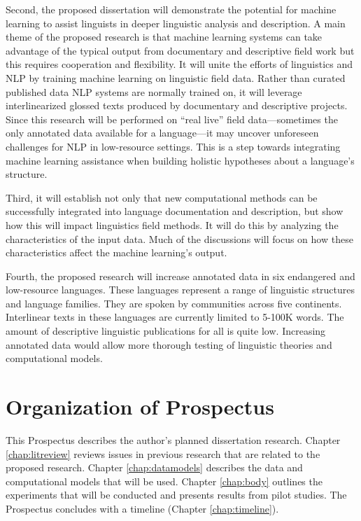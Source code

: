 Second, the proposed dissertation will demonstrate the potential for machine learning to assist linguists in deeper linguistic analysis and description. A main theme of the proposed research is that machine learning systems can take advantage of the typical output from documentary and descriptive field work but this requires cooperation and flexibility. It will unite the efforts of linguistics and NLP by training machine learning on linguistic field data. Rather than curated published data  NLP systems are normally trained on, it will leverage interlinearized glossed texts produced by documentary and descriptive projects. Since this research will be performed on “real live” field data---sometimes the only annotated data available for a language---it may uncover unforeseen challenges for NLP in low-resource settings.
This is a step towards integrating machine learning assistance when building holistic hypotheses about a language's structure.

Third, it will establish not only that new computational methods can be successfully integrated into language documentation and description, but show how this will impact linguistics field methods. It will do this by analyzing the characteristics of the input data. Much of the discussions will focus on how these characteristics affect the machine learning's output.

Fourth, the proposed research will increase annotated data in six endangered and low-resource languages. These languages represent a range of linguistic structures and language families. They are spoken by communities across five continents. Interlinear texts in these languages are currently limited to 5-100K words. The amount of descriptive linguistic publications for all is quite low. Increasing annotated data would allow more thorough testing of linguistic theories and computational models.

\section{Organization of Prospectus}

This Prospectus describes the author's planned dissertation research. Chapter \ref{chap:litreview} reviews issues in previous research that are related to the proposed research. Chapter \ref{chap:datamodels} describes the data and computational models that will be used. Chapter \ref{chap:body} outlines the experiments that will be conducted and presents results from pilot studies. The Prospectus concludes with a timeline (Chapter \ref{chap:timeline}). %

